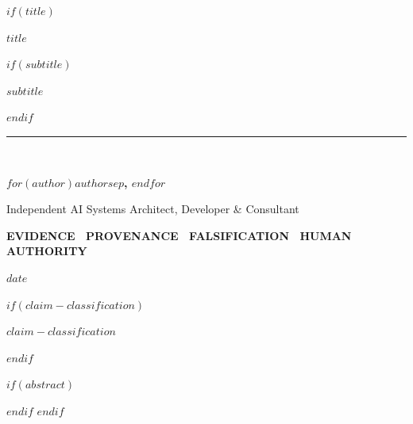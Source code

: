 $if(title)$
\begin{titlepage}
\pagecolor{BrandNavy}
\color{white}
\thispagestyle{empty}

\vspace*{0.72in}
\hspace*{0.78in}{\color{BrandGold}\rule{1.1in}{4pt}}

\vspace{0.34in}

\vspace{0.72in}
\hspace*{0.78in}\begin{minipage}{6.65in}
{\raggedright{}\rmfamily\bfseries\fontsize{36}{40}\selectfont $title$\par}
$if(subtitle)$
\vspace{0.35in}
{\sffamily\color{white!78}\fontsize{17}{23}\selectfont $subtitle$\par}
$endif$
\end{minipage}

\vfill
\hspace*{0.78in}\begin{minipage}{6.65in}
{\color{white!42}\rule{6.1in}{0.6pt}}\\[0.24in]
{\sffamily\bfseries\fontsize{15}{18}\selectfont $for(author)$$author$$sep$, $endfor$\par}
\vspace{0.08in}
{\sffamily\color{white!68}\fontsize{10.5}{14}\selectfont Independent AI Systems Architect, Developer \& Consultant\par}
\vspace{0.34in}
{\sffamily\bfseries\color{BrandGold}\fontsize{9.5}{12}\selectfont EVIDENCE \textbullet\ PROVENANCE \textbullet\ FALSIFICATION \textbullet\ HUMAN AUTHORITY\par}
\vspace{0.25in}
{\sffamily\color{white!62}\fontsize{9}{12}\selectfont $date$\par}
$if(claim-classification)$
\vspace{0.09in}
{\sffamily\color{white!58}\fontsize{8.5}{11}\selectfont $claim-classification$\par}
$endif$
\end{minipage}
\vspace*{0.64in}

\restoregeometry
\end{titlepage}
\nopagecolor
\color{BodyInk}
\setcounter{page}{1}

$if(abstract)$
\begin{abstract}
$abstract$
\end{abstract}
$endif$
$endif$

